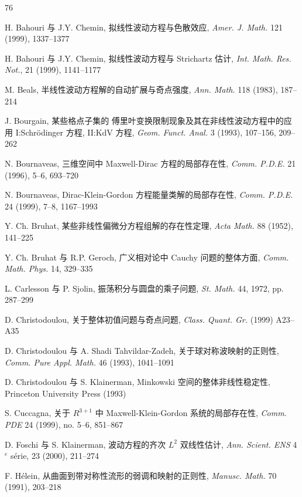 \begin{mybibliography}{76}

 H. Bahouri 与 J.Y. Chemin,  拟线性波动方程与色散效应,  \emph{Amer. J. Math.} 121 (1999),  1337--1377

 H. Bahouri 与 J.Y. Chemin,  拟线性波动方程与 Strichartz 估计,  \emph{Int. Math. Res. Not.},  21 (1999),  1141--1177

 M. Beals,  半线性波动方程解的自动扩展与奇点强度,  \emph{Ann. Math.} 118 (1983),  187--214

 J. Bourgain,  某些格点子集的 傅里叶变换限制现象及其在非线性波动方程中的应用 I:Schrödinger 方程, II:KdV 方程,  \emph{Geom. Funct. Anal.} 3 (1993),  107--156,  209--262

 N. Bournaveas,  三维空间中 Maxwell-Dirac 方程的局部存在性,  \emph{Comm. P.D.E.} 21 (1996),  5--6,  693--720

 N. Bournaveas,  Dirac-Klein-Gordon 方程能量类解的局部存在性,  \emph{Comm. P.D.E.} 24 (1999),  7--8,  1167--1993

 Y. Ch. Bruhat,  某些非线性偏微分方程组解的存在性定理,  \emph{Acta Math.} 88 (1952),  141--225

 Y. Ch. Bruhat 与 R.P. Geroch,  广义相对论中 Cauchy 问题的整体方面,  \emph{Comm. Math. Phys.} 14,  329--335

 L. Carlesson 与 P. Sjolin,  振荡积分与圆盘的乘子问题,  \emph{St. Math.} 44,  1972,  pp. 287--299

 D. Christodoulou,  关于整体初值问题与奇点问题,  \emph{Class. Quant. Gr.} (1999) A23--A35

 D. Christodoulou 与 A. Shadi Tahvildar-Zadeh,  关于球对称波映射的正则性,  \emph{Comm. Pure Appl. Math.} 46 (1993),  1041--1091

 D. Christodoulou 与 S. Klainerman,  Minkowski 空间的整体非线性稳定性,  Princeton University Press (1993)

 S. Cuccagna,  关于 $R^{3+1}$ 中 Maxwell-Klein-Gordon 系统的局部存在性,  \emph{Comm. PDE} 24 (1999),  no. 5--6,  851--867

 D. Foschi 与 S. Klainerman,  波动方程的齐次 $L^{2}$ 双线性估计,  \emph{Ann. Scient. ENS} 4$^{e}$ série,  23 (2000),  211--274

 F. Hélein,  从曲面到带对称性流形的弱调和映射的正则性,  \emph{Manusc. Math.} 70 (1991),  203--218


\end{mybibliography}
